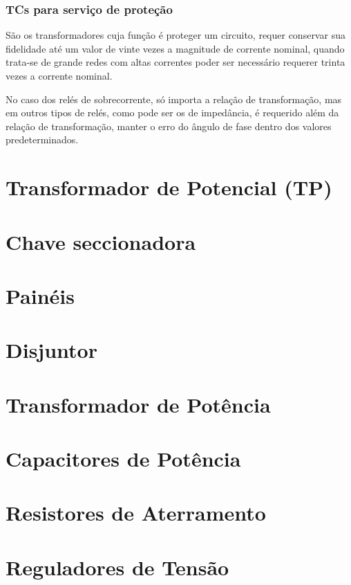 			\subsubsection{TCs para serviço de proteção}
				São os transformadores cuja função é proteger um circuito, requer conservar sua fidelidade até um valor de vinte vezes a magnitude de corrente nominal, quando trata-se de grande redes com altas correntes poder ser necessário requerer trinta vezes a corrente nominal.\par
				No caso dos relés de sobrecorrente, só importa a relação de transformação, mas em outros tipos de relés, como pode ser os de impedância, é requerido além da relação de transformação, manter o erro do ângulo de fase dentro dos valores predeterminados.\cite{apuntesmeza}\par

	\section{Transformador de Potencial (TP)}

	\section{Chave seccionadora}

	\section{Painéis}

	\section{Disjuntor}

	\section{Transformador de Potência}

	\section{Capacitores de Potência}

	\section{Resistores de Aterramento}

	\section{Reguladores de Tensão}

